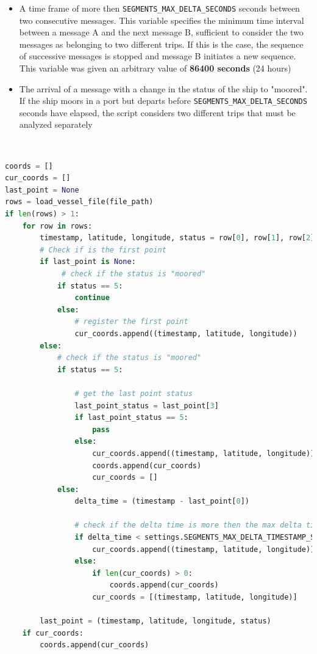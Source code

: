     \begin{itemize}
    
    \item A time frame of more then \verb|SEGMENTS_MAX_DELTA_SECONDS| seconds between two consecutive messages. This variable specifies the minimum time interval between a message A and the next message B, sufficient to consider the two messages as belonging to two different trips. If this is the case, the sequence of successive messages is stopped and message B initiates a new sequence. This variable was given an arbitrary value of \textbf{86400 seconds} (24 hours)
    
    \item The arrival of a message with a change in the status of the ship to "moored". If the ship moors in a port but departs before \verb|SEGMENTS_MAX_DELTA_SECONDS| seconds have elapsed, the script considers two different trips that must be analyzed separately
    \end{itemize}
    \\
    \begin{minipage}{\linewidth}
    \begin{lstlisting}[language=Python]
coords = []
cur_coords = []
last_point = None
rows = load_vessel_file(file_path)
if len(rows) > 1:
    for row in rows:
        timestamp, latitude, longitude, status = row[0], row[1], row[2], row[3]
        # Check if is the first point
        if last_point is None:
             # check if the status is "moored"
            if status == 5:
                continue
            else:
                # register the first point
                cur_coords.append((timestamp, latitude, longitude))
        else:
            # check if the status is "moored"
            if status == 5:

                # get the last point status
                last_point_status = last_point[3]
                if last_point_status == 5:
                    pass
                else:
                    cur_coords.append((timestamp, latitude, longitude))
                    coords.append(cur_coords)
                    cur_coords = []
            else:
                delta_time = (timestamp - last_point[0])
                
                # check if the delta time is more then the max delta time
                if delta_time < settings.SEGMENTS_MAX_DELTA_TIMESTAMP_SECONDS:
                    cur_coords.append((timestamp, latitude, longitude))
                else:
                    if len(cur_coords) > 0:
                        coords.append(cur_coords)
                    cur_coords = [(timestamp, latitude, longitude)]

        last_point = (timestamp, latitude, longitude, status)
    if cur_coords:
        coords.append(cur_coords)
    \end{lstlisting}
    \end{minipage}

